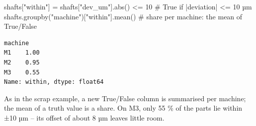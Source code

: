 \documentclass[
  letterpaper,
  DIV=11,
  numbers=noendperiod]{scrreprt}
\newenvironment{Shaded}{\begin{snugshade}}{\end{snugshade}}
\newcommand{\BuiltInTok}[1]{\textcolor[rgb]{0.00,0.23,0.31}{#1}}
\newcommand{\CommentTok}[1]{\textcolor[rgb]{0.37,0.37,0.37}{#1}}
\newcommand{\DecValTok}[1]{\textcolor[rgb]{0.68,0.00,0.00}{#1}}
\newcommand{\NormalTok}[1]{\textcolor[rgb]{0.00,0.23,0.31}{#1}}
\newcommand{\OperatorTok}[1]{\textcolor[rgb]{0.37,0.37,0.37}{#1}}
\newcommand{\StringTok}[1]{\textcolor[rgb]{0.13,0.47,0.30}{#1}}
\begin{document}
\begin{tcolorbox}[enhanced jigsaw, left=2mm, title=\textcolor{quarto-callout-caution-color}{\faFire}\hspace{0.5em}{Solution to Exercise 3}, opacityback=0, breakable, rightrule=.15mm, arc=.35mm, toptitle=1mm, colbacktitle=quarto-callout-caution-color!10!white, opacitybacktitle=0.6, coltitle=black, colframe=quarto-callout-caution-color-frame, bottomrule=.15mm, leftrule=.75mm, bottomtitle=1mm, titlerule=0mm, toprule=.15mm, colback=white]

\begin{Shaded}
\begin{Highlighting}[]
\NormalTok{shafts[}\StringTok{"within"}\NormalTok{] }\OperatorTok{=}\NormalTok{ shafts[}\StringTok{"dev\_um"}\NormalTok{].}\BuiltInTok{abs}\NormalTok{() }\OperatorTok{\textless{}=} \DecValTok{10}       \CommentTok{\# True if |deviation| \textless{}= 10 µm}
\NormalTok{shafts.groupby(}\StringTok{"machine"}\NormalTok{)[}\StringTok{"within"}\NormalTok{].mean()            }\CommentTok{\# share per machine: the mean of True/False}
\end{Highlighting}
\end{Shaded}

\begin{verbatim}
machine
M1    1.00
M2    0.95
M3    0.55
Name: within, dtype: float64
\end{verbatim}

As in the scrap example, a new True/False column is summarised per
machine; the mean of a truth value is a share. On M3, only 55 \% of the
parts lie within ±10 µm -- its offset of about 8 µm leaves little room.

\end{tcolorbox}
\end{document}
